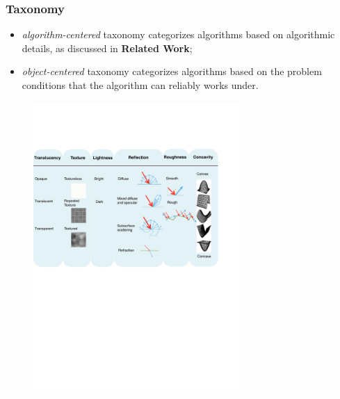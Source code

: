 \documentclass{beamer}
\begin{document}
\begin{frame}
\frametitle{Taxonomy}
\begin{itemize}
\item \textit{algorithm-centered} taxonomy categorizes algorithms based on algorithmic details, as discussed in \textbf{Related Work};
\item \textit{object-centered} taxonomy categorizes algorithms based on the problem conditions that the algorithm can reliably works under.
\end{itemize}

\begin{figure}[h]
\includegraphics[width=0.7\textwidth]{taxo/obj_class}
\end{figure}

\end{frame}
\end{document}
